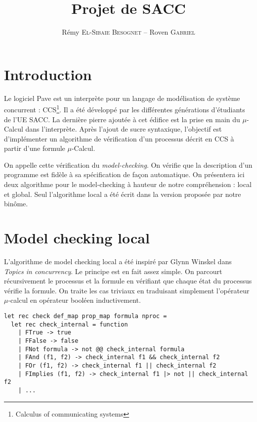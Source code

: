 \documentclass[a4paper]{article}
\title{Projet de SACC}
\author{Rémy \textsc{El-Sibaie Besognet} -- Roven \textsc{Gabriel}}
\begin{document}
\maketitle

\section{Introduction}

Le logiciel Pave est un interprète pour un langage de modélisation de
système concurrent : CCS\footnote{Calculus of communicating
systems}. Il a été développé par les différentes générations
d'étudiants de l'UE SACC. La dernière pierre ajoutée à cet édifice est
la prise en main du $\mu$-Calcul dans l'interprète. Après l'ajout de
sucre syntaxique, l'objectif est d'implémenter un algorithme de
vérification d'un processus décrit en CCS à partir d'une formule
$\mu$-Calcul.

On appelle cette vérification du \emph{model-checking}. On vérifie
que la description d'un programme est fidèle à sa spécification de
façon automatique. On présentera ici deux algorithme pour le
model-checking
à hauteur de notre compréhension : local et global. Seul
l'algorithme local a été écrit dans la version proposée par notre binôme.


\section{Model checking local}

L'algorithme de model checking local a été inspiré par Glynn Winskel
dans \emph{Topics in concurrency}. Le principe est en fait assez
simple. On parcourt récursivement le processus et la formule en
vérifiant que chaque état du processus vérifie la formule. On traite
les cas triviaux en traduisant simplement l'opérateur $\mu$-calcul en
opérateur booléen inductivement.

\begin{lstlisting}[language=caml]
let rec check def_map prop_map formula nproc =
  let rec check_internal = function
    | FTrue -> true
    | FFalse -> false
    | FNot formula -> not @@ check_internal formula
    | FAnd (f1, f2) -> check_internal f1 && check_internal f2
    | FOr (f1, f2) -> check_internal f1 || check_internal f2
    | FImplies (f1, f2) -> check_internal f1 |> not || check_internal f2
    | ...
\end{lstlisting}
\end{document}
